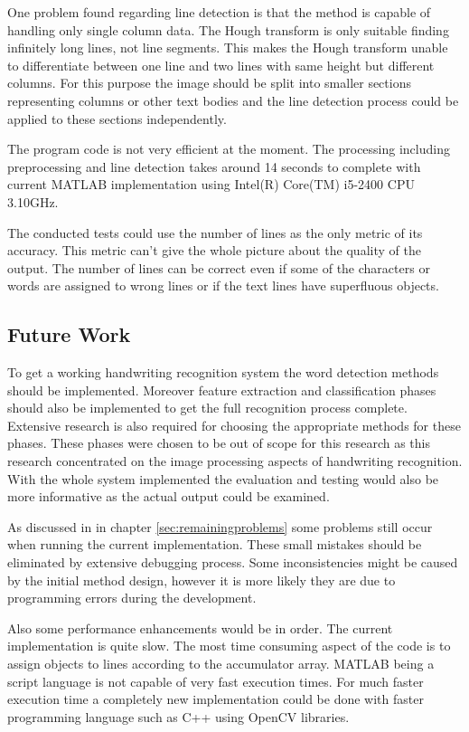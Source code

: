 \documentclass{article}
\begin{document}
      One problem found regarding line detection is that the method is capable of handling only single column data. The Hough transform is only suitable finding infinitely long lines, not line segments. This makes the Hough transform unable to differentiate between one line and two lines with same height but different columns. For this purpose the image should be split into smaller sections representing columns or other text bodies and the line detection process could be applied to these sections independently.

      The program code is not very efficient at the moment. The processing including preprocessing and line detection takes around 14 seconds to complete with current MATLAB implementation using Intel(R) Core(TM) i5-2400 CPU 3.10GHz.

      The conducted tests could use the number of lines as the only metric of its accuracy. This metric can't give the whole picture about the quality of the output. The number of lines can be correct even if some of the characters or words are assigned to wrong lines or if the text lines have superfluous objects.

    \subsection{Future Work}
      To get a working handwriting recognition system the word detection methods should be implemented. Moreover feature extraction and classification phases should also be implemented to get the full recognition process complete. Extensive research is also required for choosing the appropriate methods for these phases. These phases were chosen to be out of scope for this research as this research concentrated on the image processing aspects of handwriting recognition. With the whole system implemented the evaluation and testing would also be more informative as the actual output could be examined.

      As discussed in in chapter \ref{sec:remainingproblems} some problems still occur when running the current implementation. These small mistakes should be eliminated by extensive debugging process. Some inconsistencies might be caused by the initial method design, however it is more likely they are due to programming errors during the development.

      Also some performance enhancements would be in order. The current implementation is quite slow. The most time consuming aspect of the code is to assign objects to lines according to the accumulator array. MATLAB being a script language is not capable of very fast execution times. For much faster execution time a completely new implementation could be done with faster programming language such as C++ using OpenCV \cite{OpenCV} libraries.

  \newpage
  
  
\end{document}
